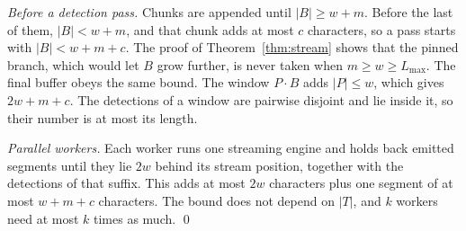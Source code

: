 \emph{Before a detection pass.} Chunks are appended until $|B| \ge w + m$. Before the last of them, $|B| < w + m$, and that chunk adds at most $c$ characters, so a pass starts with $|B| < w + m + c$. The proof of Theorem~\ref{thm:stream} shows that the pinned branch, which would let $B$ grow further, is never taken when $m \ge w \ge L_{\max}$. The final buffer obeys the same bound. The window $P \cdot B$ adds $|P| \le w$, which gives $2w + m + c$. The detections of a window are pairwise disjoint and lie inside it, so their number is at most its length.

\emph{Parallel workers.} Each worker runs one streaming engine and holds back emitted segments until they lie $2w$ behind its stream position, together with the detections of that suffix. This adds at most $2w$ characters plus one segment of at most $w + m + c$ characters. The bound does not depend on $|T|$, and $k$ workers need at most $k$ times as much.
\qed
